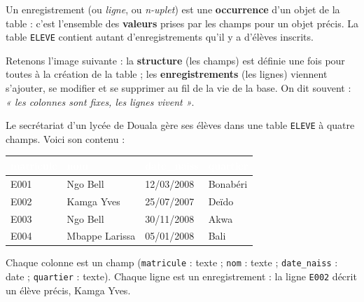 \documentclass[11pt]{article}
\newcommand{\cle}[1]{{\popxbold\color{popdark}#1}}
\begin{document}
\begin{definition}[Enregistrement]
Un \cle{enregistrement} (ou \emph{ligne}, ou \emph{n-uplet}) est une \textbf{occurrence} d'un objet de la table : c'est l'ensemble des \textbf{valeurs} prises par les champs pour un objet précis. La table \texttt{ELEVE} contient autant d'enregistrements qu'il y a d'élèves inscrits.
\end{definition}

Retenons l'image suivante : la \textbf{structure} (les champs) est définie une fois pour toutes à la création de la table ; les \textbf{enregistrements} (les lignes) viennent s'ajouter, se modifier et se supprimer au fil de la vie de la base. On dit souvent : \emph{« les colonnes sont fixes, les lignes vivent »}.

\begin{exemplebox}
Le secrétariat d'un lycée de Douala gère ses élèves dans une table \texttt{ELEVE} à quatre champs. Voici son contenu :

\begin{center}
\begin{tabularx}{\linewidth}{|l|X|l|X|}
\hline
\rowcolor{popblue}\textcolor{white}{\textbf{matricule}} & \textcolor{white}{\textbf{nom}} & \textcolor{white}{\textbf{date\_naiss}} & \textcolor{white}{\textbf{quartier}} \\
\hline
E001 & Ngo Bell & 12/03/2008 & Bonabéri \\
E002 & Kamga Yves & 25/07/2007 & Deïdo \\
E003 & Ngo Bell & 30/11/2008 & Akwa \\
E004 & Mbappe Larissa & 05/01/2008 & Bali \\
\hline
\end{tabularx}
\end{center}

Chaque colonne est un \cle{champ} (\texttt{matricule} : texte ; \texttt{nom} : texte ; \texttt{date\_naiss} : date ; \texttt{quartier} : texte). Chaque ligne est un \cle{enregistrement} : la ligne \texttt{E002} décrit un élève précis, Kamga Yves.
\end{exemplebox}
\end{document}
